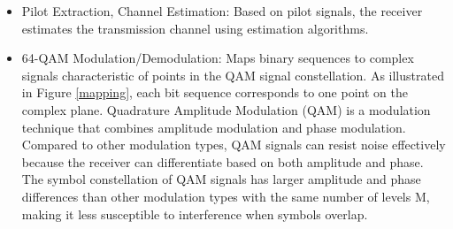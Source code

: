 \begin{itemize}
    \item Pilot Extraction, Channel Estimation: Based on pilot signals, the receiver estimates the transmission channel using estimation algorithms.
    \item 64-QAM Modulation/Demodulation: Maps binary sequences to complex signals characteristic of points in the QAM signal constellation. As illustrated in Figure \ref{mapping}, each bit sequence corresponds to one point on the complex plane. Quadrature Amplitude Modulation (QAM) is a modulation technique that combines amplitude modulation and phase modulation. Compared to other modulation types, QAM signals can resist noise effectively because the receiver can differentiate based on both amplitude and phase. The symbol constellation of QAM signals has larger amplitude and phase differences than other modulation types with the same number of levels M, making it less susceptible to interference when symbols overlap.
\end{itemize}

